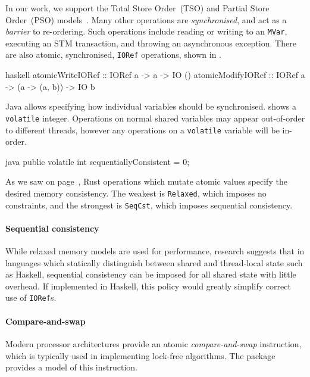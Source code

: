 In our work, we support the Total Store Order~(TSO) and Partial Store
Order~(PSO) models~.  Many other operations are
\emph{synchronised}, and act as a \emph{barrier} to re-ordering.  Such
operations include reading or writing to an \verb|MVar|, executing an
STM transaction, and throwing an asynchronous exception.  There are
also atomic, synchronised, \verb|IORef| operations, shown in
.

\begin{listing}
\centering
\begin{cminted}{haskell}
atomicWriteIORef  :: IORef a -> a -> IO ()
atomicModifyIORef :: IORef a -> (a -> (a, b)) -> IO b
\end{cminted}
\caption{Atomic operations in Haskell.}\label{lst:atomic_haskell}
\end{listing}

Java allows specifying how individual variables should be
synchronised.   shows a \verb|volatile| integer.
Operations on normal shared variables may appear out-of-order to
different threads, however any operations on a \verb|volatile|
variable will be in-order.

\begin{listing}
\centering
\begin{cminted}{java}
public volatile int sequentiallyConsistent = 0;
\end{cminted}
\caption{Atomic operations in Java.}\label{lst:atomic_java}
\end{listing}

As we saw on page~\pageref{page:rust_mem}, Rust operations which
mutate atomic values specify the desired memory consistency.  The
weakest is \verb|Relaxed|, which imposes no constraints, and the
strongest is \verb|SeqCst|, which imposes sequential consistency.

\paragraph{Sequential consistency}
While relaxed memory models are used for performance, research
suggests that in languages which statically distinguish between shared
and thread-local state such as Haskell, sequential consistency can be
imposed for all shared state with little overhead\cite{vollmer2017}.
If implemented in Haskell, this policy would greatly simplify correct
use of \verb|IORef|s.

\paragraph{Compare-and-swap}
Modern processor architectures provide an atomic
\emph{compare-and-swap} instruction, which is typically used in
implementing lock-free algorithms\cite{dice2013}.  The
 package provides a model of this instruction.

